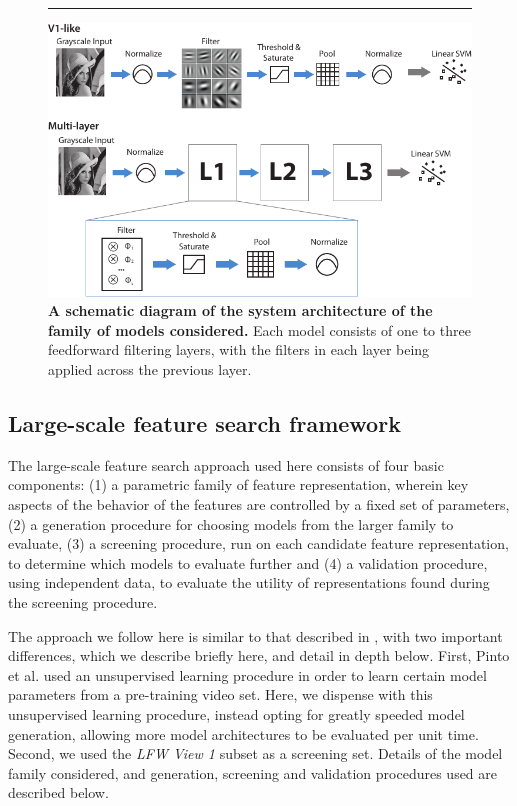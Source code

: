 
\begin{figure}[ht]
\begin{center}
	\rule{1\linewidth}{0pt}
        \includegraphics[width=0.75\linewidth]{figures/models_v2.pdf}
\end{center}
   \caption{{\bf A schematic diagram of the system architecture of the family of
       models considered.}  Each model consists of one to three feedforward
     filtering layers, with the filters in each layer being applied across the
     previous layer.}
\label{fig:models}
\end{figure}



\subsection{Large-scale feature search framework}
\label{sec:feature_search}

The large-scale feature search approach used here consists of four basic components:
(1) a parametric family of feature representation, wherein key aspects of the behavior of the 
features are controlled by a fixed set of parameters, (2) a generation procedure for 
choosing models from the larger family to evaluate, (3) a screening procedure, run on 
each candidate feature representation, to determine which models to evaluate further
and (4) a validation procedure, using independent data, to evaluate the utility of representations found
during the screening procedure.

The approach we follow here is similar to that described in \cite{pinto:plos09},
with two important differences, which we describe briefly here, and detail in depth below.
First, Pinto et al. \cite{pinto:plos09} used an unsupervised learning procedure in 
order to learn certain model parameters from a pre-training video set.  Here, we dispense with 
this unsupervised learning procedure, instead opting for greatly speeded model generation, allowing
more model architectures to be evaluated per unit time.  Second, we used the \emph{LFW View 1} subset 
as a screening set.  Details of the model family considered, and generation, screening and validation  
procedures used are described below.


